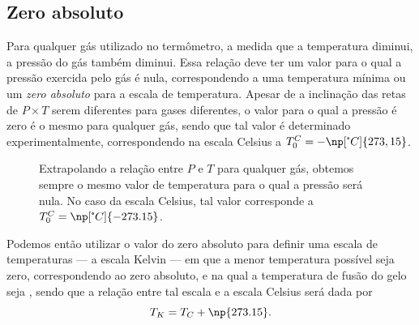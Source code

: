 \subsection{Zero absoluto}

Para qualquer gás utilizado no termômetro, a medida que a temperatura diminui, a pressão do gás também diminui. Essa relação deve ter um valor para o qual a pressão exercida pelo gás é nula, correspondendo a uma temperatura mínima ou um \emph{zero absoluto} para a escala de temperatura. Apesar de a inclinação das retas de $P \times T$ serem diferentes para gases diferentes, o valor para o qual a pressão é zero é o mesmo para qualquer gás, sendo que tal valor é determinado experimentalmente, correspondendo na escala Celsius a $T_0^C = -\np[\tcdegree C]{273,15}$.

\begin{figure}\forceversofloat
\centering
{}
\caption{Extrapolando a relação entre $P$ e $T$ para qualquer gás, obtemos sempre o mesmo valor de temperatura para o qual a pressão será nula. No caso da escala Celsius, tal valor corresponde a $T_0^C = \np[\tcdegree C]{-273.15}$.}
\end{figure}

Podemos então utilizar o valor do zero absoluto para definir uma escala de temperaturas --- a escala Kelvin --- em que a menor temperatura possível seja zero, correspondendo ao zero absoluto, e na qual a temperatura de fusão do gelo seja , sendo que a relação entre tal escala e a escala Celsius será dada por
\begin{equation}\label{Eq:RelKC}
	T_K = T_C + \np{273.15}.
\end{equation}

